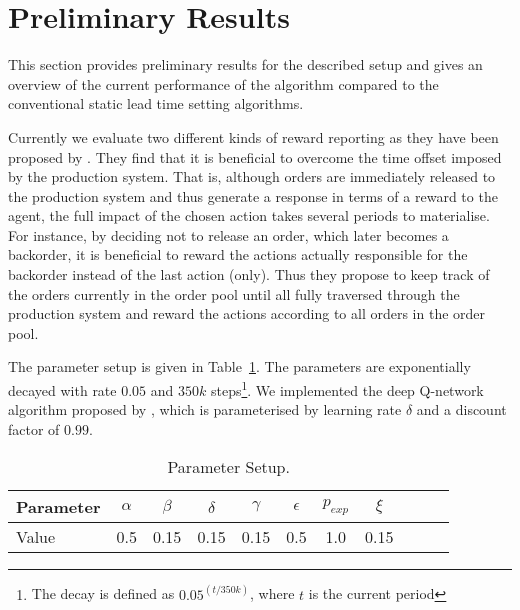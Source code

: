 \documentclass[envcountsame]{llncs}
\begin{document}
\section{Preliminary Results}
\label{sec:Preliminary}

This section provides preliminary results for the described setup and gives an overview of the
current performance of the algorithm compared to the conventional static lead time setting
algorithms.

Currently we evaluate two different kinds of reward reporting as they have been proposed by
\cite{Schneckenreither2019}. They find that it is beneficial to overcome the time offset imposed by
the production system. That is, although orders are immediately released to the production system
and thus generate a response in terms of a reward to the agent, the full impact of the chosen action
takes several periods to materialise. For instance, by deciding not to release an order, which later
becomes a backorder, it is beneficial to reward the actions actually responsible for the backorder
instead of the last action (only). Thus they propose to keep track of the orders currently in the
order pool until all fully traversed through the production system and reward the actions according
to all orders in the order pool.

The parameter setup is given in Table~\ref{tbl:params}. The parameters are exponentially decayed
with rate \(0.05\) and \(350k\) steps\footnote{The decay is defined as \(0.05 ^{(t/350k)}\), where
  \(t\) is the current period}. We implemented the deep Q-network algorithm proposed by
\cite{mnih2015human}, which is parameterised by learning rate \(\delta\) and a discount factor of
\(0.99\).


\begin{table}[t]
  \centering

  \begin{tabular}{|l||c|c|c|c|c|c|c|c|c|c|}
    \hline
    Parameter & $\alpha$ & $\beta$ & $\delta$ & $\gamma$ & $\epsilon$ & $p_{exp}$ & $\xi$ \\
    \hline
    Value & 0.5 & 0.15 & 0.15 & 0.15 & 0.5 & 1.0 & 0.15 \\
    \hline
  \end{tabular}


  \caption{\label{tbl:params}Parameter Setup.}
\end{table}
\end{document}
